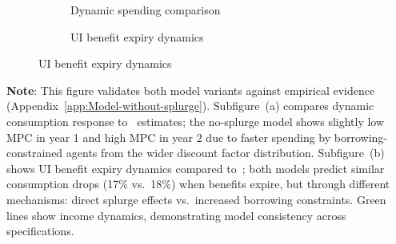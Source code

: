 \documentclass[\latexroot/\projectname]{subfiles}
\begin{document}
\begin{figure}[H]
  \centering
  \caption{\pregenmark Validation moments in models with and without splurge}
  \whenintegrated{\label{fig:untargetedMoments_wSplZero}} %
  \noindent\begin{minipage}{\textwidth}
    \centering
    \begin{subfigure}[b]{.48\linewidth}
      \centering
      \caption{Dynamic spending comparison}
      \whenintegrated{\label{fig:USaggmpclotterywin_wSplZero}} %
    \end{subfigure}
    \begin{subfigure}[b]{.48\linewidth}
      \centering
      \caption{UI benefit expiry dynamics}
      \whenintegrated{\label{fig:expiryUI_wSplZero}} %
    \end{subfigure}
  \end{minipage}
\end{figure}
\noindent\parbox{\textwidth}{\footnotesize
  \textbf{Note}: This figure validates both model variants against empirical evidence (Appendix~\ref{app:Model-without-splurge}).
  Subfigure~(a) compares dynamic consumption response to~\cite{fagereng-mpc-2021} estimates;
  the no-splurge model shows slightly low MPC in year 1 and high MPC in year 2 due to
  faster spending by borrowing-constrained agents from the wider discount factor distribution.
  Subfigure~(b) shows UI benefit expiry dynamics compared to~\cite{ganongConsumer2019};
  both models predict similar consumption drops (17\% vs.\ 18\%) when benefits expire,
  but through different mechanisms: direct splurge effects vs.\ increased borrowing constraints.
  Green lines show income dynamics, demonstrating model consistency across specifications.
}

\vspace{2em}  %

\smartbib
\end{document}
